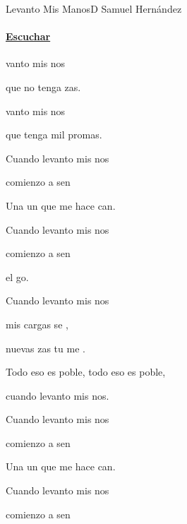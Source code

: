 \documentclass[12pt, spanish]{book}
\begin{document}
    \begin{song}{Levanto Mis Manos}{D}
    {} %
    {Samuel Hernández}
    {} %
    {}
        \ifChordBk
        \paragraph{\mbox{}\hfill\protect\href{https://open.spotify.com/intl-es/track/79y4fe9RE0KtxXGj4WmRT5}{Escuchar}\mbox{}\hfill}
        \fi

        \begin{SBOpGroup}
            vanto mis nos

            que no tenga zas.

            vanto mis nos

            que tenga mil promas.
        \end{SBOpGroup}

        \begin{SBChorus}
            Cuando levanto mis nos

            comienzo a sen

            Una un que me hace can.

            Cuando levanto mis nos

            comienzo a sen

            el go.

            Cuando levanto mis nos

            mis cargas se ,

            nuevas zas tu me .

            Todo eso es poble, todo eso es poble,

            cuando levanto mis nos.
        \end{SBChorus}

        \begin{SBChorus}
            Cuando levanto mis nos

            comienzo a sen

            Una un que me hace can.

            Cuando levanto mis nos

            comienzo a sen


\end{SBChorus}
\end{song}
\end{document}
